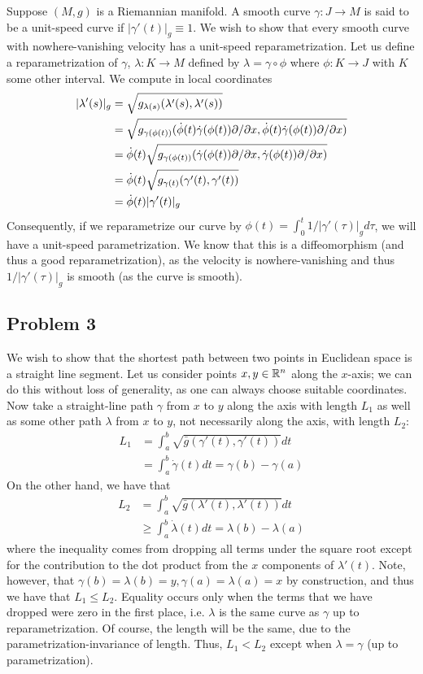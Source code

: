 \documentclass{../../mathnotes}
\begin{document}
Suppose $(M,g)$ is a Riemannian manifold. A smooth curve $\gamma:J\to M$ is said to be a unit-speed curve if
$|\gamma'(t)|_g\equiv1$. We wish to show that every smooth curve with nowhere-vanishing velocity has a unit-speed
reparametrization. Let us define a reparametrization of $\gamma$, $\lambda:K\to M$ defined by $\lambda=\gamma\circ\phi$
where $\phi:K\to J$ with $K$ some other interval.
We compute in local coordinates
\begin{align*}
    |\lambda'(s)|_g&=\sqrt{g_{\lambda(s)}(\lambda'(s),\lambda'(s))}\\
    &=\sqrt{g_{\gamma(\phi(t))}(\dot\phi(t)\dot\gamma(\phi(t))\partial/\partial x,\dot\phi(t)\dot\gamma(\phi(t))\partial/\partial x)}\\
    &=\dot\phi(t)\sqrt{g_{\gamma(\phi(t))}(\dot\gamma(\phi(t))\partial/\partial x,\dot\gamma(\phi(t))\partial/\partial x)}\\
    &=\dot\phi(t)\sqrt{g_{\gamma(t)}(\gamma'(t),\gamma'(t))}\\
    &=\dot\phi(t)|\gamma'(t)|_g
\end{align*}
Consequently, if we reparametrize our curve by $\phi(t)=\int_0^t 1/|\gamma'(\tau)|_gd\tau$, we will have a unit-speed parametrization.
We know that this is a diffeomorphism (and thus a good reparametrization), as the velocity is nowhere-vanishing and
thus $1/|\gamma'(\tau)|_g$ is smooth (as the curve is smooth).

\subsection*{Problem 3}

We wish to show that the shortest path between two points in Euclidean space is a straight line segment.
Let us consider points $x,y\in\mathbb{R}^n$ along the $x$-axis; we can do this without loss of generality, as one can always
choose suitable coordinates. Now take a straight-line path $\gamma$ from $x$ to $y$ along the axis with length $L_1$ as well as some
other path $\lambda$ from $x$ to $y$, not necessarily along the axis, with length $L_2$:
\begin{align*}
    L_1&=\int_a^b\sqrt{\bar g(\gamma'(t),\gamma'(t))} dt\\
    &=\int_a^b\dot\gamma(t) dt=\gamma(b)-\gamma(a)
\end{align*}
On the other hand, we have that
\begin{align*}
    L_2&=\int_a^b\sqrt{\bar g(\lambda'(t),\lambda'(t))} dt\\
    &\geq\int_a^b\dot\lambda(t) dt=\lambda(b)-\lambda(a)
\end{align*}
where the inequality comes from dropping all terms under the square root except for the contribution to the dot product
from the $x$ components of $\lambda'(t)$. Note, however, that $\gamma(b)=\lambda(b)=y,\gamma(a)=\lambda(a)=x$ by construction,
and thus we have that $L_1\leq L_2$. Equality occurs only when the terms that we have dropped were zero in the first place,
i.e. $\lambda$ is the same curve as $\gamma$ up to reparametrization. Of course, the length will be the same, due to the
parametrization-invariance of length. Thus, $L_1<L_2$ except when $\lambda=\gamma$ (up to parametrization).
\end{document}
